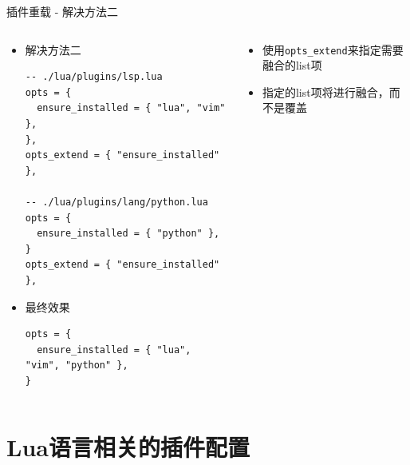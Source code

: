 \documentclass[aspectratio=169]{ctexbeamer}
\begin{document}
\begin{frame}[fragile]{插件重载 - 解决方法二}
  \begin{columns}
    \begin{column}{0.5\linewidth}
      \begin{itemize}
        \item 解决方法二
          \begin{lstlisting}[basicstyle=\tiny\ttfamily]
-- ./lua/plugins/lsp.lua
opts = {
  ensure_installed = { "lua", "vim" },
},
opts_extend = { "ensure_installed" },

-- ./lua/plugins/lang/python.lua
opts = {
  ensure_installed = { "python" },
}
opts_extend = { "ensure_installed" },
          \end{lstlisting}
        \item 最终效果
          \begin{lstlisting}[basicstyle=\tiny\ttfamily]
opts = {
  ensure_installed = { "lua", "vim", "python" },
}
          \end{lstlisting}
      \end{itemize}
    \end{column}

    \begin{column}{0.5\linewidth}
      \begin{itemize}
        \item 使用\lstinline{opts_extend}来指定需要融合的list项
        \item 指定的list项将进行融合，而不是覆盖
      \end{itemize}
    \end{column}
  \end{columns}
\end{frame}

\section{Lua语言相关的插件配置}
\end{document}

